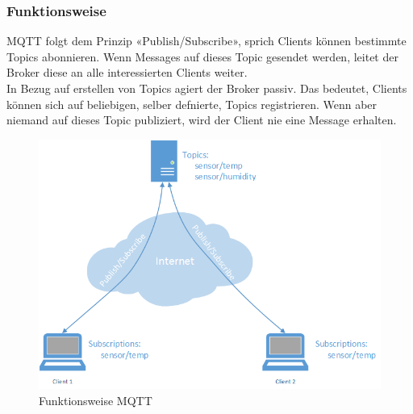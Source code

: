 \subsubsection{Funktionsweise}
MQTT folgt dem Prinzip «Publish/Subscribe», sprich Clients können bestimmte Topics abonnieren. Wenn Messages auf dieses Topic gesendet werden, leitet der Broker diese an alle interessierten Clients weiter. \\
In Bezug auf erstellen von Topics agiert der Broker passiv. Das bedeutet, Clients können sich auf beliebigen, selber defnierte, Topics registrieren. Wenn aber niemand auf dieses Topic publiziert, wird der Client nie eine Message erhalten.

\begin{figure}[h!]
	\centering
		\includegraphics[scale=0.6]{report/img/mqttFunktionsweise}
	\caption{Funktionsweise MQTT}
	\label{fig:deploymentAzure}
\end{figure}






